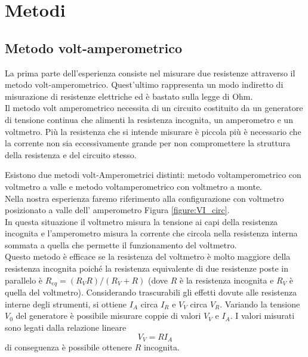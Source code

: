 \documentclass[italian, a4paper, 10pt, twocolumn]{../../style/lab_unige}
\newcommand{\reffig}[1]{Figura {\ref{#1}}}%
\begin{document}

    \section{Metodi}
    \label{section:methods}

    \subsection{Metodo volt-amperometrico}

    La prima parte dell’esperienza consiste nel misurare due resistenze attraverso il metodo volt-amperometrico. Quest’ultimo rappresenta un modo indiretto di misurazione di resistenze elettriche ed è bastato sulla legge di Ohm.\\
    Il metodo volt amperometrico necessita di un circuito costituito da un generatore di tensione continua che alimenti la resistenza incognita, un amperometro e un voltmetro. Più la resistenza che si intende misurare è piccola più è necessario che la corrente non sia eccessivamente grande per non compromettere la struttura della resistenza e del circuito stesso.

    Esistono due metodi volt-Amperometrici distinti: metodo voltamperometrico con voltmetro a valle e metodo voltamperometrico con voltmetro a monte.\\
    Nella nostra esperienza faremo riferimento alla configurazione con voltmetro posizionato a valle dell’ amperometro \reffig{figure:VI_circ}.\\
    In questa situazione il voltmetro misura la tensione ai capi della resistenza incognita e l’amperometro misura la corrente che circola nella resistenza interna sommata a quella  che permette il funzionamento del voltmetro.\\
    Questo metodo è efficace se la resistenza del voltmetro è molto maggiore della resistenza incognita poiché la resistenza equivalente di due resistenze poste in parallelo è $R_{eq}=(R_V R)/(R_V+R)$ (dove $R$ è la resistenza incognita e $R_V$ è quella del voltmetro).
    Considerando trascurabili gli effetti dovute alle resistenza interne degli strumenti, si ottiene $I_A$ circa $I_R$ e $V_V$ circa $V_R$. 
    Variando la tensione $V_0$ del generatore è possibile misurare coppie di valori $V_V$ e $I_A$.  I valori misurati sono legati dalla relazione lineare \begin{equation}
        V_V =RI_A \label{equation:VI}
    \end{equation} di conseguenza è possibile ottenere $R$ incognita.
\end{document}

